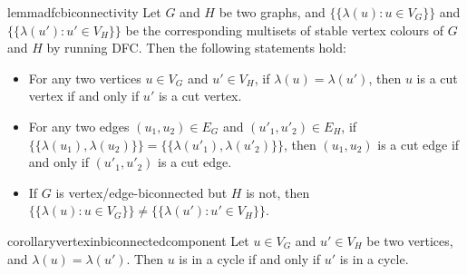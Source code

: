 \begin{restatable}[]{lemma}{dfcbiconnectivity}
\label{lemma:dfcbiconnectivity}
Let $G$ and $H$ be two graphs, and %
$\{\!\!\{ \lambda(u):u\in V_G\}\!\!\}$ and $\{\!\!\{ \lambda(u'):u'\in V_H\}\!\!\}$ be the corresponding multisets of stable vertex colours of $G$ and $H$ by running DFC. Then the following statements hold: 


\begin{itemize}
    \item For any two vertices $u\in V_G$ and $u'\in V_H$, if $\lambda(u) = \lambda(u')$, then $u$ is a cut vertex if and only if $u'$ is a cut vertex.
    \item For any two edges $(u_1,u_2)\in E_G$ and $(u'_1,u'_2)\in E_H$, if $\{\!\!\{ \lambda(u_1), \lambda(u_2)\}\!\!\} = \{\!\!\{ \lambda(u'_1), \lambda(u'_2)\}\!\!\}$, then $(u_1,u_2)$ is a cut edge if and only if $(u'_1,u'_2)$ is a cut edge.
    \item If $G$ is vertex/edge-biconnected but $H$ is not, then $\{\!\!\{\lambda(u): u\in V_G\}\!\!\} \neq \{\!\!\{\lambda(u'):u'\in V_H\}\!\!\}$.
\end{itemize}
\end{restatable}


\begin{restatable}[]{corollary}{vertexinbiconnectedcomponent}
\label{corollary:vertexinbiconnectedcomponent}
Let $u\in V_G$ and $u'\in V_H$ be two vertices, and $\lambda(u) = \lambda(u')$. Then $u$ is in a cycle if and only if $u'$ is in a cycle. 

\end{restatable}


